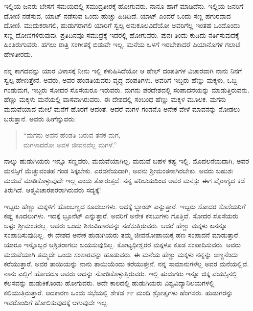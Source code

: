 ಇಲ್ಲಿಯ ಜನರು ಬೇಸಗೆ ಸಮಯದಲ್ಲಿ ಸಮುದ್ರತೀರಕ್ಕೆ ಹೋಗುವರು. ನಾನೂ ಹಾಗೆ ಮಾಡಿದೆನು. ಇಲ್ಲಿಯ ಜನರಿಗೆ ದೋಣಿ ನಡೆಸುವ, ಯಾಟ್ ನಡೆಸುವ ಒಂದು ಹುಚ್ಚು ಹಿಡಿದಿದೆ. ಯಾಟ್ ಎಂದರೆ ಒಂದು ಸಣ್ಣ ಹಗುರವಾದ ದೋಣಿ. ಮುದುಕರಾಗಲಿ, ಹುಡುಗರಾಗಲಿ ಯಾರಿಗೆ ಸ್ವಲ್ಪ ಅನುಕೂಲವಿದೆಯೋ ಅವರಿಗೆಲ್ಲ ಇಂತಹ ಒಂದೊಂದು ಸಣ್ಣ ದೋಣಿಗಳಿರುವುವು. ಪ್ರತಿದಿನವೂ ಸಮುದ್ರಕ್ಕೆ ಇದರಲ್ಲಿ ಹೋಗುವರು. ಪುನಃ ತಿಂದು ಕುಡಿದು ನರ್ತಿಸುವುದಕ್ಕೆ ಹಿಂತಿರುಗುವರು. ಹಗಲು ರಾತ್ರಿ ಸಂಗೀತಕ್ಕೆ ಬಿಡುವೇ ಇಲ್ಲ. ಮನೆಯ ಒಳಗೆ ಇರಬೇಕಾದರೆ ಪಿಯಾನೊಗಳ ಗಲಾಟೆ ಹೇಳತೀರದು.

\vspace{0.1cm}

ನನ್ನ ಕಾಗದವನ್ನು ಯಾರ ವಿಳಾಸಕ್ಕೆ ನೀನು ಇಲ್ಲಿ ಕಳುಹಿಸಿದೆಯೋ ಆ ಹೇಲ್ ದಂಪತಿಗಳ ವಿಚಾರವಾಗಿ ನಾನು ನಿನಗೆ ಸ್ವಲ್ಪ ಹೇಳುತ್ತೇನೆ. ಅವರು, ಅವರ ಹೆಂಡತಿಯವರು ವೃದ್ಧ ದಂಪತಿಗಳು. ಅವರಿಗೆ ಇಬ್ಬರು ಹೆಣ್ಣು ಮಕ್ಕಳು, ಒಬ್ಬ ಗಂಡುಮಗ, ಇಬ್ಬರು ಸೋದರ ಸೊಸೆಯರೂ ಇರುವರು. ಮಗನು ಪರದೇಶದಲ್ಲಿ ಸಂಪಾದನೆಯನ್ನು ಮಾಡುತ್ತಿರುವನು. ಹೆಣ್ಣು ಮಕ್ಕಳು ಮನೆಯಲ್ಲಿ ವಾಸವಾಗಿರುವರು. ಈ ದೇಶದಲ್ಲಿ ಸಂಬಂಧ ಹೆಣ್ಣು ಮಕ್ಕಳ ಮೂಲಕ. ಮಗನು ಮದುವೆಯಾದ ಮೇಲೆ ಮನೆಗೆ ಹೊರಗೆ ಆದಂತೆ. ಆದರೆ ಮಗಳ ಗಂಡನೊ ಅನೇಕ ವೇಳೆ ಮಾವನನ್ನು ನೋಡಲು ಬರುತ್ತಾನೆ. ಅವರು ಹೀಗೆನ್ನುವರು:

\begin{verse}
“ಮಗನು ಅವನ ಹೆಂಡತಿ ಬರುವ ತನಕ ಮಗ,\\ಮಗಳಾದರೋ ಅವಳ ಜೀವನವೆಲ್ಲ ಮಗಳೆ.”
\end{verse}

ನಾಲ್ಕು ಹುಡುಗಿಯರು ಇನ್ನೂ ಸಣ್ಣವರು, ಮದುವೆಯಾಗಿಲ್ಲ. ಮದುವೆ ಬಹಳ ಕಷ್ಟ ಇಲ್ಲಿ. ಮೊದಲನೆಯದಾಗಿ, ಅವರ ಮನಸ್ಸಿಗೆ ಮೆಚ್ಚುವಂತಹ ಗಂಡ ಸಿಕ್ಕಬೇಕು. ಎರಡನೆಯದಾಗಿ, ಅವನು ಶ‍್ರೀಮಂತನಾಗಿರಬೇಕು. ಅವರು ಬಹುಶಃ ಮದುವೆ ಮಾಡಿಕೊಳ್ಳುವುದೇ ಇಲ್ಲ ಎಂದು ತೋರುತ್ತದೆ. ನನ್ನ ಪರಿಚಯದಿಂದ ಅವರ ಮನಸ್ಸು ಈಗ ವೈರಾಗ್ಯದ ಕಡೆ ತಿರುಗಿದೆ. ಆತ್ಮವಿಚಾರಪರರಾಗಿರುವರು ಸದ್ಯಕ್ಕೆ!

\vspace{0.13cm}

ಇಬ್ಬರು ಹೆಣ್ಣು ಮಕ್ಕಳಿಗೆ ಹೊಂಬಣ್ಣದ ಕೂದಲುಗಳು. ಅದಕ್ಕೆ ಬ್ಲಾಂಡ್ ಎನ್ನುತ್ತಾರೆ. ಇಬ್ಬರು ಸೋದರ ಸೊಸೆಯರಿಗೆ ಕಪ್ಪು ಕೂದಲುಗಳು. ಇದಕ್ಕೆ ಬ್ರೂನೆಟ್ ಎನ್ನುತ್ತಾರೆ. ಅವರಿಗೆ ಅನೇಕ ಕಸಬುಗಳು ಗೊತ್ತಿವೆ. ಸೋದರ ಸೊಸೆಯರು ಅಷ್ಟು ಶ‍್ರೀಮಂತರಲ್ಲ. ಅವರು ಒಂದು ಶಿಶುವಿಹಾರವನ್ನು ನಡೆಸುತ್ತಿರುವರು. ಆದರೆ ಹೆಣ್ಣು ಮಕ್ಕಳು ಏನನ್ನೂ ಸಂಪಾದಿಸುವುದಿಲ್ಲ. ಈ ದೇಶದ ಅನೇಕ ಹುಡುಗಿಯರು ತಮ್ಮ ಜೀವನೋಪಾಯಕ್ಕೆ ಹಣ ಸಂಪಾದನೆ ಮಾಡುತ್ತಾರೆ. ಯಾರೂ ಇನ್ನೊಬ್ಬರ ಆಶ್ರಿತರಾಗಲು ಬಯಸುವುದಿಲ್ಲ. ಕೋಟ್ಯಧೀಶ್ವರರ ಮಕ್ಕಳೂ ಕೂಡ ಸಂಪಾದಿಸುವರು. ಅವರು ಮದುವೆಯಾಗಿ ತಮ್ಮದೇ ಒಂದು ಸಂಸಾರವನ್ನು ಹೂಡುವರು. ಈ ಮನೆಯ ಹೆಣ್ಣು ಮಕ್ಕಳು ನನ್ನನ್ನು ಅಣ್ಣನೆಂದು ಕರೆಯುತ್ತಾರೆ. ಅವರ ತಾಯಿಯನ್ನು ನಾನು ತಾಯಿಯೆಂದು ಕರೆಯುತ್ತೇನೆ. ನನ್ನ ಸಾಮಾನುಗಳೆಲ್ಲ ಅವರ ಮನೆಯಲ್ಲಿವೆ. ನಾನು ಎಲ್ಲಿಗೆ ಹೋದರೂ ಅವರು ಅದನ್ನು ನೋಡಿಕೊಳ್ಳುತ್ತಿರುವರು. ಇಲ್ಲಿ ಹುಡುಗರು ಇನ್ನೂ ಚಿಕ್ಕ ವಯಸ್ಸಿನಲ್ಲಿ ಕೆಲಸವನ್ನು ಹುಡುಕಿಕೊಂಡು ಹೋಗುವರು. ಅದೇ ಕಾಲದಲ್ಲಿ ಹುಡುಗಿಯರು ವಿಶ್ವವಿದ್ಯಾನಿಲಯಗಳಲ್ಲಿ ಕಲಿಯುತ್ತಿರುತ್ತಾರೆ. ಆದಕಾರಣ ಒಂದು ಸಭೆಯಲ್ಲಿ ಶೇಕಡ ೯೯ ಮಂದಿ ಶ್ರೋತೃಗಳು ಹೆಂಗಸರು. ಹುಡುಗರನ್ನು ಇವರೊಂದಿಗೆ ಹೋಲಿಸುವುದಕ್ಕೆ ಆಗುವುದೇ ಇಲ್ಲ.

